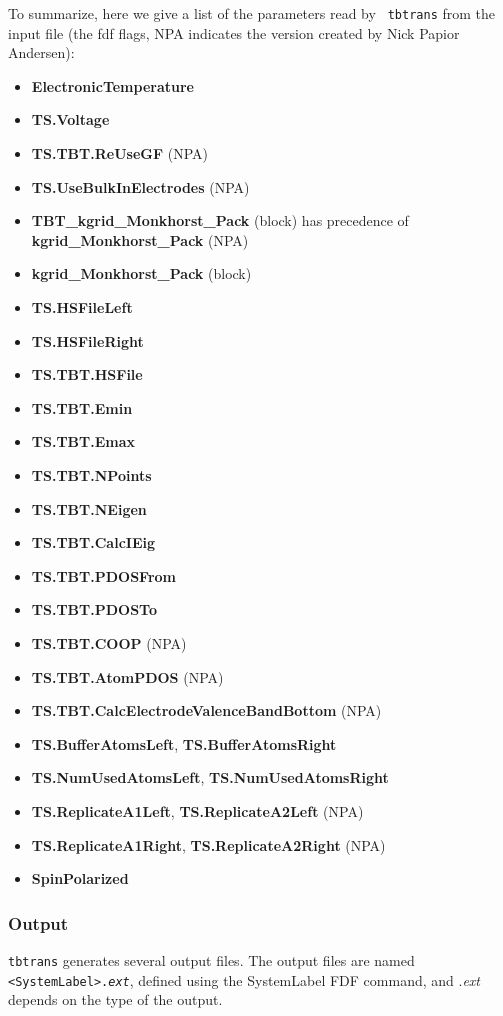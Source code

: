\documentclass[11pt]{article}
\begin{document}
To summarize, here we give a list of the parameters read by {\tt
  tbtrans} from the input file (the fdf flags, NPA indicates the version
created by Nick Papior Andersen):
\begin{itemize}
 \item {\bf ElectronicTemperature}
 \item {\bf TS.Voltage}
 \item {\bf TS.TBT.ReUseGF} (NPA)
 \item {\bf TS.UseBulkInElectrodes} (NPA)
 \item {\bf TBT\_kgrid\_Monkhorst\_Pack} (block) has precedence of 
 {\bf kgrid\_Monkhorst\_Pack} (NPA)
 \item {\bf kgrid\_Monkhorst\_Pack} (block)
 \item {\bf TS.HSFileLeft}
 \item {\bf TS.HSFileRight}
 \item {\bf TS.TBT.HSFile}
 \item {\bf TS.TBT.Emin} 
 \item {\bf TS.TBT.Emax} 
 \item {\bf TS.TBT.NPoints}
 \item {\bf TS.TBT.NEigen}
 \item {\bf TS.TBT.CalcIEig}
 \item {\bf TS.TBT.PDOSFrom}
 \item {\bf TS.TBT.PDOSTo}
 \item {\bf TS.TBT.COOP} (NPA)
 \item {\bf TS.TBT.AtomPDOS} (NPA)
 \item {\bf TS.TBT.CalcElectrodeValenceBandBottom} (NPA)
 \item {\bf TS.BufferAtomsLeft}, {\bf TS.BufferAtomsRight}
 \item {\bf TS.NumUsedAtomsLeft}, {\bf TS.NumUsedAtomsRight}
 \item {\bf TS.ReplicateA1Left}, {\bf TS.ReplicateA2Left} (NPA)
 \item {\bf TS.ReplicateA1Right}, {\bf TS.ReplicateA2Right} (NPA)
 \item {\bf SpinPolarized}
\end{itemize}

\subsubsection{Output}

\texttt{tbtrans} generates several output files.  The output files are named {\tt
    <SystemLabel>.\emph{ext}}, defined using the SystemLabel FDF command, and .\emph{ext}
depends on the type of the output.
\end{document}
